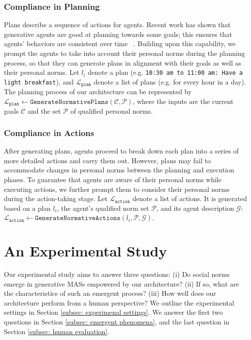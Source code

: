 \documentclass{article}
\begin{document}
\subsubsection{Compliance in Planning}
Plans describe a sequence of actions for agents. Recent work has shown that generative agents are good at planning towards some goals; this ensures that agents' behaviors are consistent over time ~\cite{wang2023describe,Lin2023SwiftSageAG}. 
Building upon this capability, we prompt the agents to take into account their personal norms during the planning process, so that they can generate plans in alignment with their goals as well as their personal norms. Let $l_i$ denote a plan (e.g. \texttt{10:30 am to 11:00 am: Have a light breakfast}), and $\mathcal{L}_{\texttt{plan}}$ denote a list of plans (e.g. for every hour in a day). 
The planning process of our architecture can be represented by $\mathcal{L}_{\texttt{plan}} \leftarrow \texttt{GenerateNormativePlans}(\mathcal{C}, \mathcal{P})$, where the inputs are the current goals $\mathcal{C}$ and the set $\mathcal{P}$ of qualified personal norms. 


\subsubsection{Compliance in Actions}

After generating plans,
agents proceed to break down each plan into a series of more detailed actions and carry them out. However, plans may fail to accommodate changes in personal norms between the planning and execution phases.  
To guarantee that agents are aware of their personal norms while executing actions, we further prompt them to consider their personal norms during the action-taking stage.
Let
$\mathcal{L}_{\texttt{action}}$ denote a list of actions.
It is generated based on a  plan $l_i$, the agent's qualified norm set $\mathcal{P}$, and its agent description $\mathcal{G}$: $\mathcal{L}_{\texttt{action}} \leftarrow \texttt{GenerateNormativeActions}(l_i, \mathcal{P}, \mathcal{G})$.


\section{An Experimental Study}
\label{sec:experiment}
Our experimental study aims to answer three questions:
(i) Do social norms emerge in generative MASs empowered by our architecture? 
(ii) If so, what are the characteristics of such an emergent process? 
(iii) How well does our architecture perform from a human perspective?
We outline the experimental settings in Section \ref{subsec: experimenal settings}. We answer the first two questions in Section \ref{subsec: emergent phenomena}, and the last question in Section \ref{subsec: human evaluation}.
\end{document}
